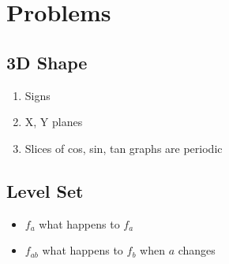 \section{Problems}

  \subsection{3D Shape}

    \begin{enumerate}
      \item Signs
      \item X, Y planes
      \item Slices of cos, sin, tan graphs are periodic
    \end{enumerate}

  \subsection{Level Set}

    \begin{itemize}
      \item $ f_{a} $ what happens to $ f_{a} $
      \item $ f_{ab} $ what happens to $ f_{b} $ when $ a $ changes
    \end{itemize}